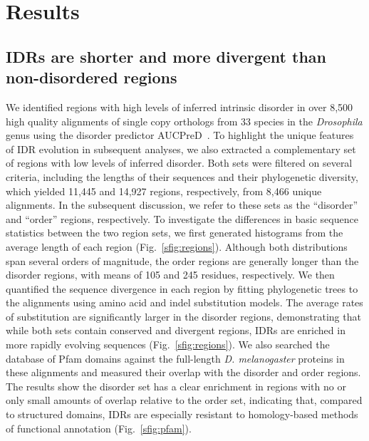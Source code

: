 \section{Results}
\subsection{IDRs are shorter and more divergent than non-disordered regions}
We identified regions with high levels of inferred intrinsic disorder in over 8,500 high quality alignments of single copy orthologs from 33 species in the \textit{Drosophila} genus using the disorder predictor AUCPreD~\cite{Wang2016}. To highlight the unique features of IDR evolution in subsequent analyses, we also extracted a complementary set of regions with low levels of inferred disorder. Both sets were filtered on several criteria, including the lengths of their sequences and their phylogenetic diversity, which yielded 11,445 and 14,927 regions, respectively, from 8,466 unique alignments. In the subsequent discussion, we refer to these sets as the ``disorder'' and ``order'' regions, respectively. To investigate the differences in basic sequence statistics between the two region sets, we first generated histograms from the average length of each region (Fig.~\ref{sfig:regions}). Although both distributions span several orders of magnitude, the order regions are generally longer than the disorder regions, with means of 105 and 245 residues, respectively. We then quantified the sequence divergence in each region by fitting phylogenetic trees to the alignments using amino acid and indel substitution models. The average rates of substitution are significantly larger in the disorder regions, demonstrating that while both sets contain conserved and divergent regions, IDRs are enriched in more rapidly evolving sequences (Fig.~\ref{sfig:regions}). We also searched the database of Pfam domains against the full-length \textit{D. melanogaster} proteins in these alignments and measured their overlap with the disorder and order regions. The results show the disorder set has a clear enrichment in regions with no or only small amounts of overlap relative to the order set, indicating that, compared to structured domains, IDRs are especially resistant to homology-based methods of functional annotation (Fig.~\ref{sfig:pfam}).

